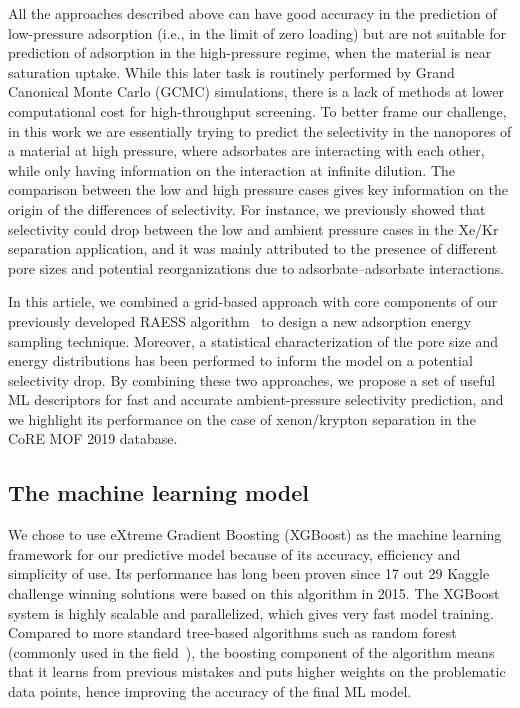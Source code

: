 \documentclass[main]{subfiles}
\begin{document}
All the approaches described above can have good accuracy in the prediction of low-pressure adsorption (i.e., in the limit of zero loading) but are not suitable for prediction of adsorption in the high-pressure regime, when the material is near saturation uptake. While this later task is routinely performed by Grand Canonical Monte Carlo (GCMC) simulations, there is a lack of methods at lower computational cost for high-throughput screening. To better frame our challenge, in this work we are essentially trying to predict the selectivity in the nanopores of a material at high pressure, where adsorbates are interacting with each other, while only having information on the interaction at infinite dilution. The comparison between the low and high pressure cases gives key information on the origin of the differences of selectivity. For instance, we previously showed that selectivity could drop between the low and ambient pressure cases in the Xe/Kr separation application, and it was mainly attributed to the presence of different pore sizes and potential reorganizations due to adsorbate--adsorbate interactions.\cite{Ren_2021}

In this article, we combined a grid-based approach with core components of our previously developed RAESS algorithm~\cite{Ren_2023} to design a new adsorption energy sampling technique. Moreover, a statistical characterization of the pore size and energy distributions has been performed to inform the model on a potential selectivity drop. By combining these two approaches, we propose a set of useful ML descriptors for fast and accurate ambient-pressure selectivity prediction, and we highlight its performance on the case of xenon/krypton separation in the CoRE MOF 2019 database\cite{Chung_2019}.

\subsection{The machine learning model}

We chose to use eXtreme Gradient Boosting (XGBoost) as the machine learning framework for our predictive model because of its accuracy, efficiency and simplicity of use. Its performance has long been proven since 17 out 29 Kaggle challenge winning solutions were based on this algorithm in 2015. The XGBoost system is highly scalable and parallelized, which gives very fast model training.\cite{chen2016xgboost} Compared to more standard tree-based algorithms such as random forest (commonly used in the field~\cite{Simon_2015}), the boosting component of the algorithm means that it learns from previous mistakes and puts higher weights on the problematic data points, hence improving the accuracy of the final ML model.
\end{document}
